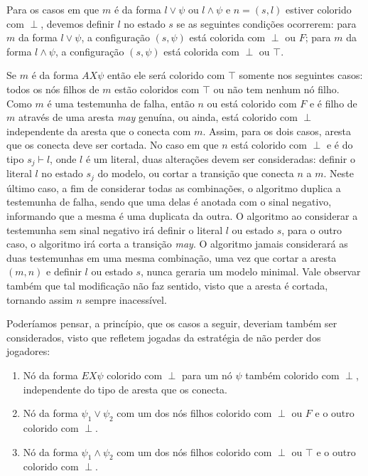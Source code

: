 \documentclass[normaltoc,capchap,capsec,times]{abnt}
\begin{document}
Para os casos em que $m$ é da forma $l \vee \psi$ ou $l \wedge \psi$ e $n=(s,l)$ estiver colorido com $\perp$, devemos definir $l$ no estado $s$ se as seguintes condições ocorrerem: para $m$ da forma $l \vee \psi$, a configuração $(s,\psi)$ está colorida com $\perp$ ou $F$; para $m$ da forma $l \wedge \psi$, a configuração $(s,\psi)$ está colorida com $\perp$ ou $\top$.


Se $m$ é da forma $AX \psi$ então ele será colorido com $\top$ somente nos seguintes casos: todos os nós filhos de $m$ estão coloridos com $\top$ ou não tem nenhum nó filho. Como $m$ é uma testemunha de falha, então $n$ ou está colorido com $F$ e é filho de $m$ através de uma aresta \textit{may} genuína, ou ainda, está colorido com $\perp$ independente da aresta que o conecta com $m$. Assim, para os dois casos, aresta que os conecta deve ser cortada. No caso em que $n$ está colorido com $\perp$ e é do tipo $s_j \vdash l$, onde $l$ é um literal, duas alterações devem ser consideradas: definir o literal $l$ no estado $s_j$ do modelo, ou cortar a transição que conecta $n$ a $m$. Neste último caso,  a fim de considerar todas as combinações, o algoritmo duplica a testemunha de falha, sendo que uma delas é anotada com o sinal negativo, informando que a mesma é uma duplicata da outra. O algoritmo ao considerar a testemunha sem sinal negativo irá definir o literal $l$ ou estado $s$, para o outro caso, o algoritmo irá corta a transição \textit{may}. O algoritmo jamais considerará as duas testemunhas em uma mesma combinação, uma vez que cortar a aresta $(m,n)$ e definir $l$ ou estado $s$, nunca geraria um modelo minimal. Vale observar também que tal modificação não faz sentido, visto que a aresta é cortada, tornando assim $n$ sempre inacessível. 

Poderíamos pensar, a princípio, que os  casos a seguir, deveriam também ser considerados, visto que refletem jogadas da estratégia de não perder dos jogadores:

\begin{enumerate}[label=(\arabic*),noitemsep]
	\item Nó da forma $EX \psi$ colorido com $\perp$ para um nó $\psi$ também colorido com $\perp$, independente do tipo de aresta que os conecta.
	\item Nó da forma $\psi_1 \vee \psi_2$ com um dos nós filhos colorido com $\perp$ ou $F$ e o outro colorido com $\perp$.
	\item Nó da forma $\psi_1 \wedge \psi_2$ com um dos nós filhos colorido com $\perp$ ou $\top$ e o outro colorido com $\perp$.
 \end{enumerate} 
 
\end{document}
